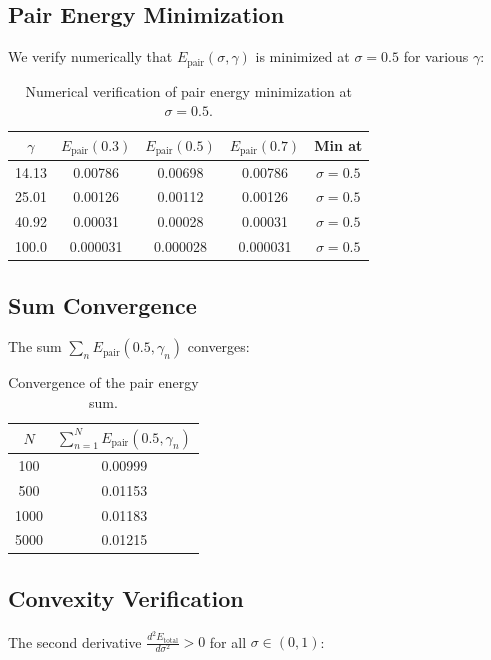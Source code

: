 \documentclass[12pt,a4paper]{article}
\theoremstyle{definition}
\theoremstyle{remark}
\newcommand{\Epair}{E_{\text{pair}}}
\newcommand{\Etotal}{E_{\text{total}}}
\begin{document}
\subsection{Pair Energy Minimization}

We verify numerically that $\Epair(\sigma, \gamma)$ is minimized at $\sigma = 0.5$ for various $\gamma$:

\begin{table}[h]
\centering
\begin{tabular}{ccccc}
\toprule
$\gamma$ & $\Epair(0.3)$ & $\Epair(0.5)$ & $\Epair(0.7)$ & Min at \\
\midrule
14.13 & 0.00786 & 0.00698 & 0.00786 & $\sigma = 0.5$ \\
25.01 & 0.00126 & 0.00112 & 0.00126 & $\sigma = 0.5$ \\
40.92 & 0.00031 & 0.00028 & 0.00031 & $\sigma = 0.5$ \\
100.0 & 0.000031 & 0.000028 & 0.000031 & $\sigma = 0.5$ \\
\bottomrule
\end{tabular}
\caption{Numerical verification of pair energy minimization at $\sigma = 0.5$.}
\end{table}

\subsection{Sum Convergence}

The sum $\sum_n \Epair(0.5, \gamma_n)$ converges:

\begin{table}[h]
\centering
\begin{tabular}{cc}
\toprule
$N$ & $\sum_{n=1}^N \Epair(0.5, \gamma_n)$ \\
\midrule
100 & 0.00999 \\
500 & 0.01153 \\
1000 & 0.01183 \\
5000 & 0.01215 \\
\bottomrule
\end{tabular}
\caption{Convergence of the pair energy sum.}
\end{table}

\subsection{Convexity Verification}

The second derivative $\frac{d^2\Etotal}{d\sigma^2} > 0$ for all $\sigma \in (0,1)$:
\end{document}
